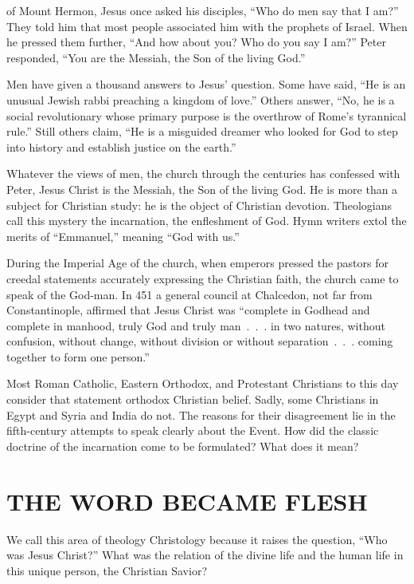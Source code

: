 
 of Mount Hermon, Jesus once asked his disciples, “Who do men say
that I am?” They told him that most people associated him with the prophets of Israel. When he
pressed them further, “And how about you? Who do you say I am?” Peter responded, “You are the
Messiah, the Son of the living God.”

Men have given a thousand answers to Jesus’ question. Some have said, “He is an unusual Jewish rabbi
preaching a kingdom of love.” Others answer, “No, he is a social revolutionary whose primary purpose
is the overthrow of Rome’s tyrannical rule.” Still others claim, “He is a misguided dreamer who
looked for God to step into history and establish justice on the earth.”

Whatever the views of men, the church through the centuries has confessed with Peter, Jesus Christ
is the Messiah, the Son of the living God. He is more than a subject for Christian study: he is the
object of Christian devotion. Theologians call this mystery the incarnation, the enfleshment of God.
Hymn writers extol the merits of “Emmanuel,” meaning “God with us.”

During the Imperial Age of the church, when emperors pressed the pastors for creedal statements
accurately expressing the Christian faith, the church came to speak of the God-man. In 451 a general
council at Chalcedon, not far from Constantinople, affirmed that Jesus Christ was “complete in
Godhead and complete in manhood, truly God and truly man~.~.~. in two natures, without confusion,
without change, without division or without separation~.~.~. coming together to form one person.”

Most Roman Catholic, Eastern Orthodox, and Protestant Christians to this day consider that statement
orthodox Christian belief. Sadly, some Christians in Egypt and Syria and India do not. The reasons
for their disagreement lie in the fifth-century attempts to speak clearly about the Event. How did
the classic doctrine of the incarnation come to be formulated? What does it mean?

\section{THE WORD BECAME FLESH}

We call this area of theology Christology because it raises the question, “Who was Jesus Christ?”
What was the relation of the divine life and the human life in this unique person, the Christian
Savior?

